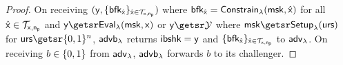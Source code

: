 \begin{proof}
	On receiving $(\mathsf{y}, \{\mathsf{bfk}_{\hat{\mathsf{x}}}\}_{\hat{\mathsf{x}}\in\mathcal{T}_{\mathsf{x}, \mathsf{n_p}}})$ where $\mathsf{bfk}_{\hat{\mathsf{x}}} = \mathsf{Constrain}_{\lambda}(\mathsf{msk}, \hat{\mathsf{x}})$ for all $\hat{\mathsf{x}} \in \mathcal{T}_{\mathsf{x}, \mathsf{n_p}}$ and $\image \getsr \bprfeval(\bprfmsk, \preimage)$ or $\image \getsr \bprfy$ where $\bprfmsk \getsr \bprfsetup(\urs)$ for $\urs \getsr \bin^{n}$, $\mathsf{advb}_{\lambda}$ returns $\mathsf{ibshk} = \mathsf{y}$ and $\{\mathsf{bfk}_{\hat{\mathsf{x}}}\}_{\hat{\mathsf{x}}\in\mathcal{T}_{\mathsf{x}, \mathsf{n_p}}}$ to ${\mathsf{adv}}_\lambda$. On receiving $b \in \{0, 1\}$ from ${\mathsf{adv}}_\lambda$, $\mathsf{advb}_{\lambda}$ forwards $b$ to its challenger.
	

\end{proof}
